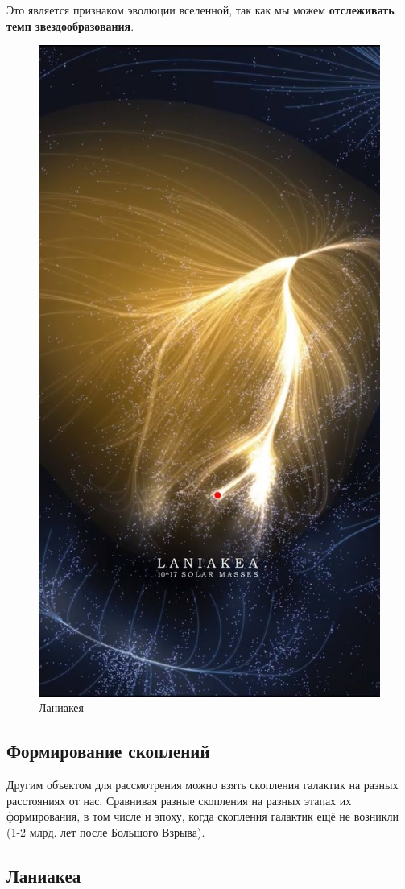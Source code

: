 Это является признаком эволюции вселенной, так как мы можем \textbf{отслеживать темп звездообразования}.
\begin{figure}
  \centering
    \includegraphics[width=0.7\linewidth]{Pictures/19_lan.jpg}
  \caption{Ланиакея}
  \label{fig:19_lan}
 \end{figure}
\subsection{Формирование скоплений}

Другим объектом для рассмотрения можно взять скопления галактик на разных расстояниях от нас. Сравнивая разные скопления на разных этапах их формирования, в том числе и эпоху, когда скопления галактик ещё не возникли (1-2 млрд. лет после Большого Взрыва).

\subsection{Ланиакеа}


